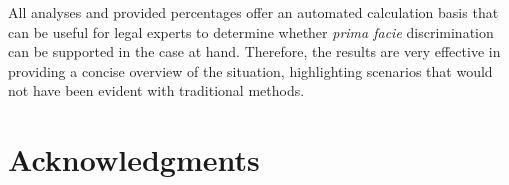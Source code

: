 \documentclass[letterpaper]{article} %
\begin{document}
All analyses and provided percentages offer an automated calculation basis that can be useful for legal experts to determine whether \emph{prima facie} discrimination can be supported in the case at hand. Therefore, the results are very effective in providing a concise overview of the situation, highlighting scenarios that would not have been evident with traditional methods.


%
%


\section{Acknowledgments}

%

\end{document}
